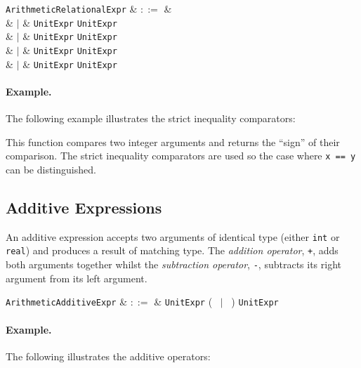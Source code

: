 \begin{syntax}
  \verb+ArithmeticRelationalExpr+ & $::=$ &\\
  & $|$ & \verb+UnitExpr+ \token{<} \verb+UnitExpr+\\
  & $|$ & \verb+UnitExpr+ \token{<=} \verb+UnitExpr+\\
  & $|$ & \verb+UnitExpr+ \token{=>} \verb+UnitExpr+\\
  & $|$ & \verb+UnitExpr+ \token{>} \verb+UnitExpr+\\
\end{syntax}

\paragraph{Example.} The following example illustrates the strict inequality comparators:



This function compares two integer arguments and returns the ``sign'' of their comparison.  The strict inequality comparators are used so the case where \lstinline{x == y} can be distinguished.


\subsection{Additive Expressions}
\label{c_expr_additive}

An additive expression accepts two arguments of identical type (either \lstinline{int} or \lstinline{real}) and produces a result of matching type.  The {\em addition operator}, \lstinline{+}, adds both arguments together whilst the {\em subtraction operator}, \lstinline{-}, subtracts its right argument from its left argument.

\begin{syntax}
  \verb+ArithmeticAdditiveExpr+ & $::=$ & \verb+UnitExpr+ \big(\ \token{+} $|$ \token{-}\ \big) \verb+UnitExpr+\\
\end{syntax}

\paragraph{Example.}  The following illustrates the additive operators:

